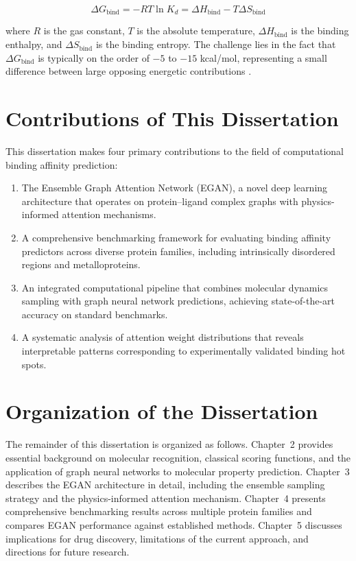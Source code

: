 \documentclass[12pt,oneside]{report}
\begin{document}
\begin{equation}\label{eq:thermo}
\Delta G_{\text{bind}} = -RT \ln K_d = \Delta H_{\text{bind}} - T\Delta S_{\text{bind}}
\end{equation}

where $R$ is the gas constant, $T$ is the absolute temperature, $\Delta H_{\text{bind}}$ is the binding enthalpy, and $\Delta S_{\text{bind}}$ is the binding entropy. The challenge lies in the fact that $\Delta G_{\text{bind}}$ is typically on the order of $-5$ to $-15$ kcal/mol, representing a small difference between large opposing energetic contributions \cite{Mobley2010}.

\section{Contributions of This Dissertation}

This dissertation makes four primary contributions to the field of computational binding affinity prediction:

\begin{enumerate}[label=(\arabic*), leftmargin=*]
\item The Ensemble Graph Attention Network (EGAN), a novel deep learning architecture that operates on protein--ligand complex graphs with physics-informed attention mechanisms.
\item A comprehensive benchmarking framework for evaluating binding affinity predictors across diverse protein families, including intrinsically disordered regions and metalloproteins.
\item An integrated computational pipeline that combines molecular dynamics sampling with graph neural network predictions, achieving state-of-the-art accuracy on standard benchmarks.
\item A systematic analysis of attention weight distributions that reveals interpretable patterns corresponding to experimentally validated binding hot spots.
\end{enumerate}

\section{Organization of the Dissertation}

The remainder of this dissertation is organized as follows. Chapter~2 provides essential background on molecular recognition, classical scoring functions, and the application of graph neural networks to molecular property prediction. Chapter~3 describes the EGAN architecture in detail, including the ensemble sampling strategy and the physics-informed attention mechanism. Chapter~4 presents comprehensive benchmarking results across multiple protein families and compares EGAN performance against established methods. Chapter~5 discusses implications for drug discovery, limitations of the current approach, and directions for future research.
\end{document}

